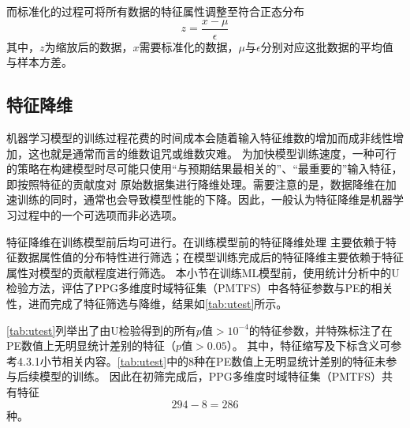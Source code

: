 而标准化的过程可将所有数据的特征属性调整至符合正态分布
\begin{equation}
    \label{equ:normalization}
    z = \frac{x - \mu}{\epsilon}
\end{equation}
其中，$z$为缩放后的数据，$x$需要标准化的数据，$\mu$与$\epsilon$分别对应这批数据的平均值与样本方差。

\subsection{特征降维}
机器学习模型的训练过程花费的时间成本会随着输入特征维数的增加而成非线性增加，这也就是通常而言的维数诅咒或维数灾难。
为加快模型训练速度，一种可行的策略在构建模型时尽可能只使用“与预期结果最相关的”、“最重要的”输入特征，即按照特征的贡献度对
原始数据集进行降维处理。需要注意的是，数据降维在加速训练的同时，通常也会导致模型性能的下降。因此，一般认为特征降维是机器学习过程中的一个可选项而非必选项。

特征降维在训练模型前后均可进行。在训练模型前的特征降维处理
主要依赖于特征数据属性值的分布特性进行筛选；在模型训练完成后的特征降维主要依赖于特征属性对模型的贡献程度进行筛选。
本小节在训练ML模型前，使用统计分析中的U检验方法，评估了PPG多维度时域特征集（PMTFS）中各特征参数与PE的相关性，进而完成了特征筛选与降维，结果如\autoref{tab:utest}所示。

\autoref{tab:utest}列举出了由U检验得到的所有$p$值$>10^{-4}$的特征参数，并特殊标注了在PE数值上无明显统计差别的特征（$p$值$> 0.05$）。
其中，特征缩写及下标含义可参考4.3.1小节相关内容。\autoref{tab:utest}中的8种在PE数值上无明显统计差别的特征未参与后续模型的训练。
因此在初筛完成后，PPG多维度时域特征集（PMTFS）共有特征
\begin{equation}
    \label{equ:fn2}
    294-8=286
\end{equation}
种。

